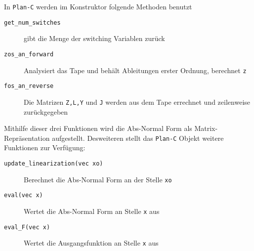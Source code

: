 In \texttt{Plan-C} werden im Konstruktor folgende Methoden benutzt
\begin{description}
 \item[\texttt{get\_num\_switches}] gibt die Menge der switching Variablen zurück
 \item[\texttt{zos\_an\_forward}] Analysiert das Tape und behält Ableitungen erster Ordnung, berechnet \texttt{z}
 \item[\texttt{fos\_an\_reverse}] Die Matrizen \texttt{Z,L,Y} und \texttt{J} werden aus dem Tape errechnet und zeilenweise zurückgegeben
\end{description}
Mithilfe dieser drei Funktionen wird die Abs-Normal Form als Matrix-Repräsentation aufgestellt.
Desweiteren stellt das \texttt{Plan-C} Objekt weitere Funktionen zur Verfügung:
\begin{description}
 \item[\texttt{update\_linearization(vec xo)}] Berechnet die Abs-Normal Form an der Stelle \texttt{xo}
 \item[\texttt{eval(vec x)}] Wertet die Abs-Normal Form an Stelle \texttt{x} aus
 \item[\texttt{eval\_F(vec x)}] Wertet die Ausgangsfunktion an Stelle \texttt{x} aus 
\end{description}

